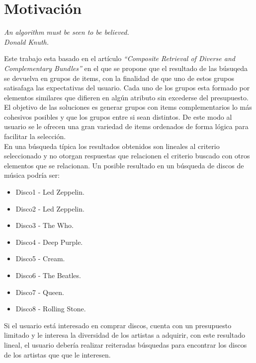 \section{Motivación}
{\begin{small}%
\begin{flushright}%
\it An algorithm must be seen to be believed.\\Donald Knuth.
\end{flushright}%
\end{small}%
\vspace{.5cm}}
Este trabajo esta basado en el artículo \textit{\textquotedblleft Composite Retrieval of Diverse 
and Complementary Bundles\textquotedblright}\cite{compositeRetrival} en el que se propone 
que el resultado de las búsuqeda se devuelva en grupos de items, con la finalidad de que uno de estos grupos satisafaga
las expectativas del usuario. Cada uno de los grupos esta formado por elementos similares que difieren en algún atributo sin excederse del presupuesto.
El objetivo de las soluciones es generar grupos con items complementarios lo más cohesivos posibles y que los grupos entre si sean distintos.
De este modo al usuario se le ofrecen una gran variedad de items ordenados de forma lógica para facilitar la selección.\\

En una búsqueda típica los resultados obtenidos son lineales al criterio seleccionado y no otorgan respuestas que relacionen 
el criterio buscado con otros elementos que se relacionan. Un posible resultado en un búsqueda de discos de música podría ser:\\
\begin{itemize}
  \item Disco1 - Led Zeppelin.
  \item Disco2 - Led Zeppelin.
  \item Disco3 - The Who.
  \item Disco4 - Deep Purple.
  \item Disco5 - Cream.
  \item Disco6 - The Beatles.
  \item Disco7 - Queen.
  \item Disco8 - Rolling Stone.
\end{itemize}

Si el usuario está interesado en comprar discos, cuenta con un presupuesto limitado y le interesa la diversidad de los artistas a adquirir, con este resultado lineal, el usuario debería realizar reiteradas búsquedas para encontrar los discos de los artistas que que le interesen.\\


